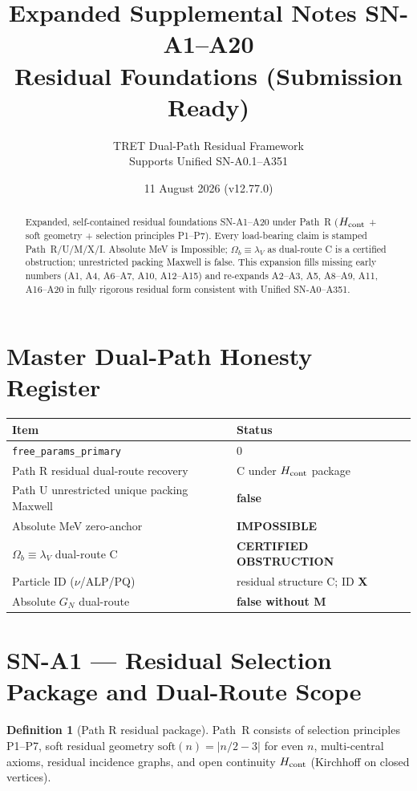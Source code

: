 \documentclass[11pt,a4paper]{article}
\title{Expanded Supplemental Notes SN-A1--A20\\Residual Foundations (Submission Ready)}
\author{TRET Dual-Path Residual Framework\\Supports Unified SN-A0.1--A351}
\date{11 August 2026 (v12.77.0)}
\theoremstyle{definition}
\newtheorem{definition}[theorem]{Definition}
\begin{document}
\maketitle
\begin{abstract}
Expanded, self-contained residual foundations SN-A1--A20 under Path~R
($H_{\rm cont}$ + soft geometry + selection principles P1--P7).
Every load-bearing claim is stamped Path~R/U/M/X/I.
Absolute MeV is Impossible; $\Omega_b\equiv\lambda_V$ as dual-route C is a certified obstruction;
unrestricted packing Maxwell is false. This expansion fills missing early numbers
(A1, A4, A6--A7, A10, A12--A15) and re-expands A2--A3, A5, A8--A9, A11, A16--A20
in fully rigorous residual form consistent with Unified SN-A0--A351.
\end{abstract}

\tableofcontents
\newpage

\section*{Master Dual-Path Honesty Register}
\begin{center}
\begin{tabular}{@{}p{7.0cm}p{5.4cm}@{}}
\toprule
\textbf{Item} & \textbf{Status} \\
\midrule
\texttt{free\_params\_primary} & $0$ \\
Path R residual dual-route recovery & C under $H_{\rm cont}$ package \\
Path U unrestricted unique packing Maxwell & \textbf{false} \\
Absolute MeV zero-anchor & \textbf{IMPOSSIBLE} \\
$\Omega_b\equiv\lambda_V$ dual-route C & \textbf{CERTIFIED OBSTRUCTION} \\
Particle ID ($\nu$/ALP/PQ) & residual structure C; ID \textbf{X} \\
Absolute $G_N$ dual-route & \textbf{false without M} \\
\bottomrule
\end{tabular}
\end{center}

\section{SN-A1 --- Residual Selection Package and Dual-Route Scope}
\label{sec:SNA1}

\begin{definition}[Path R residual package]
\label{def:A1-pathR}
Path~R consists of selection principles P1--P7, soft residual geometry
$\mathrm{soft}(n)=|n/2-3|$ for even $n$, multi-central axioms, residual incidence graphs,
and open continuity $H_{\rm cont}$ (Kirchhoff on closed vertices).
\end{definition}
\end{document}
